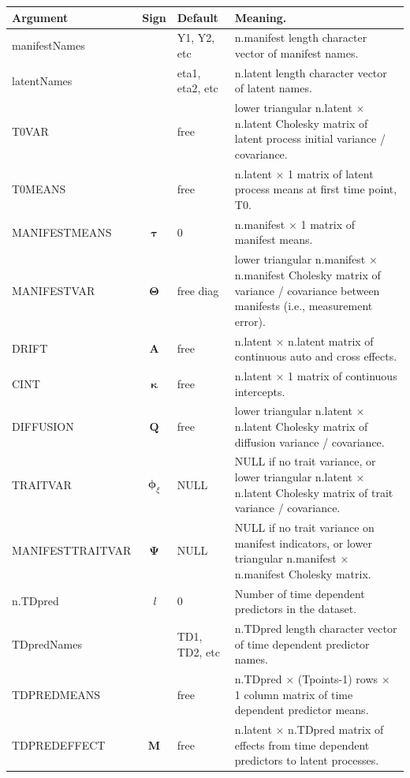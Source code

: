 \documentclass[nojss]{jss}\usepackage[]{graphicx}\usepackage[]{color}
\begin{document}
\begin{table}
\vspace{\baselineskip}
\begin{tabular}{@{}l@{}|@{}c@{}|l@{}| p{8.6cm} }
\textbf{Argument} & \textbf{Sign} & \textbf{Default} & \textbf{Meaning}.\\
\hline
manifestNames & & Y1, Y2, etc & n.manifest length character vector of manifest names.\\
latentNames & & eta1, eta2, etc & n.latent length character vector of latent names.\\
T0VAR & & free & lower triangular n.latent $\times$ n.latent Cholesky matrix of latent process initial variance / covariance.\\
T0MEANS & & free & n.latent $\times$ 1 matrix of latent process means at first time point, T0.\\
MANIFESTMEANS & $\boldsymbol{\tau}$ & 0 & n.manifest $\times$ 1 matrix of manifest means.\\
MANIFESTVAR & $\boldsymbol{\Theta}$ & free diag & lower triangular n.manifest $\times$ n.manifest Cholesky matrix of variance / covariance between manifests (i.e., measurement error).\\
DRIFT & \textbf{A} & free & n.latent $\times$ n.latent matrix of continuous auto and cross effects.\\ 
CINT & $\boldsymbol{\kappa}$ & free & n.latent $\times$ 1 matrix of continuous intercepts.\\
DIFFUSION & $\textbf{Q}$ & free & lower triangular n.latent $\times$ n.latent Cholesky matrix of diffusion variance / covariance.\\
TRAITVAR & $\boldsymbol{\phi}_{\xi}$ & NULL & NULL if no trait variance, or lower triangular n.latent $\times$ n.latent Cholesky matrix of trait variance / covariance.\\
MANIFESTTRAITVAR & $\boldsymbol{\Psi}$ & NULL & NULL if no trait variance on manifest indicators, or lower triangular n.manifest $\times$ n.manifest  Cholesky matrix.\\
n.TDpred & \textit{l} & 0 & Number of time dependent predictors in the dataset.\\
TDpredNames & & TD1, TD2, etc & n.TDpred length character vector of time dependent predictor names.\\
TDPREDMEANS & & free & n.TDpred $\times$ (Tpoints-1) rows $\times$ 1 column matrix of time dependent  predictor means.\\
TDPREDEFFECT & $\textbf{M}$ & free & n.latent $\times$ n.TDpred matrix of effects from time dependent predictors to latent processes.\\

\end{tabular}
\end{table}
\end{document}
